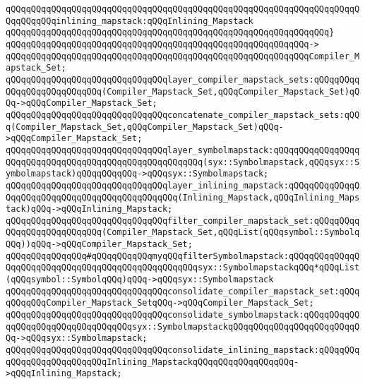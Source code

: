 \verb|qQQqqQQqqQQqqQQqqQQqqQQqqQQqqQQqqQQqqQQqqQQqqQQqqQQqqQQqqQQqqQQqqQQqqQQqqQQqqQQqinlining_mapstack:qQQqInlining_Mapstack|\newline
\verb|qQQqqQQqqQQqqQQqqQQqqQQqqQQqqQQqqQQqqQQqqQQqqQQqqQQqqQQqqQQqqQQq}|\newline
\verb|qQQqqQQqqQQqqQQqqQQqqQQqqQQqqQQqqQQqqQQqqQQqqQQqqQQqqQQqqQQq->|\newline
\verb|qQQqqQQqqQQqqQQqqQQqqQQqqQQqqQQqqQQqqQQqqQQqqQQqqQQqqQQqqQQqCompiler_Mapstack_Set;|\newline
\newline
\verb|qQQqqQQqqQQqqQQqqQQqqQQqqQQqqQQqlayer_compiler_mapstack_sets:qQQqqQQqqQQqqQQqqQQqqQQqqQQq(Compiler_Mapstack_Set,qQQqCompiler_Mapstack_Set)qQQq->qQQqCompiler_Mapstack_Set;|\newline
\verb|qQQqqQQqqQQqqQQqqQQqqQQqqQQqqQQqconcatenate_compiler_mapstack_sets:qQQq(Compiler_Mapstack_Set,qQQqCompiler_Mapstack_Set)qQQq->qQQqCompiler_Mapstack_Set;|\newline
\verb|qQQqqQQqqQQqqQQqqQQqqQQqqQQqqQQqlayer_symbolmapstack:qQQqqQQqqQQqqQQqqQQqqQQqqQQqqQQqqQQqqQQqqQQqqQQqqQQqqQQq(syx::Symbolmapstack,qQQqsyx::Symbolmapstack)qQQqqQQqqQQq->qQQqsyx::Symbolmapstack;|\newline
\verb|qQQqqQQqqQQqqQQqqQQqqQQqqQQqqQQqlayer_inlining_mapstack:qQQqqQQqqQQqqQQqqQQqqQQqqQQqqQQqqQQqqQQqqQQqqQQq(Inlining_Mapstack,qQQqInlining_Mapstack)qQQq->qQQqInlining_Mapstack;|\newline
\verb|qQQqqQQqqQQqqQQqqQQqqQQqqQQqqQQqfilter_compiler_mapstack_set:qQQqqQQqqQQqqQQqqQQqqQQqqQQq(Compiler_Mapstack_Set,qQQqList(qQQqsymbol::SymbolqQQq))qQQq->qQQqCompiler_Mapstack_Set;|\newline
\newline
\verb|qQQqqQQqqQQqqQQq#qQQqqQQqqQQqmyqQQqfilterSymbolmapstack:qQQqqQQqqQQqqQQqqQQqqQQqqQQqqQQqqQQqqQQqqQQqqQQqqQQqsyx::SymbolmapstackqQQq*qQQqList(qQQqsymbol::SymbolqQQq)qQQq->qQQqsyx::Symbolmapstack|\newline
\newline
\verb|qQQqqQQqqQQqqQQqqQQqqQQqqQQqqQQqconsolidate_compiler_mapstack_set:qQQqqQQqqQQqCompiler_Mapstack_SetqQQq->qQQqCompiler_Mapstack_Set;|\newline
\verb|qQQqqQQqqQQqqQQqqQQqqQQqqQQqqQQqconsolidate_symbolmapstack:qQQqqQQqqQQqqQQqqQQqqQQqqQQqqQQqqQQqsyx::SymbolmapstackqQQqqQQqqQQqqQQqqQQqqQQqqQQq->qQQqsyx::Symbolmapstack;|\newline
\verb|qQQqqQQqqQQqqQQqqQQqqQQqqQQqqQQqconsolidate_inlining_mapstack:qQQqqQQqqQQqqQQqqQQqqQQqqQQqInlining_MapstackqQQqqQQqqQQqqQQqqQQq->qQQqInlining_Mapstack;|\newline

